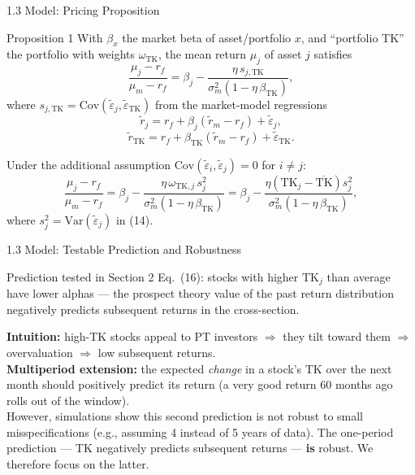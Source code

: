 \documentclass[aspectratio=169, 11pt]{beamer}
\begin{document}
\begin{frame}[shrink=10]{1.3 Model: Pricing Proposition}
\begin{block}{Proposition 1}
With $\beta_x$ the market beta of asset/portfolio $x$, and ``portfolio TK'' the portfolio with weights $\omega_{\mathrm{TK}}$, the mean return $\mu_j$ of asset $j$ satisfies
\begin{equation}
\frac{\mu_j-r_f}{\mu_m-r_f}=\beta_j-\frac{\eta\, s_{j,\mathrm{TK}}}{\sigma_m^2\left(1-\eta\,\beta_{\mathrm{TK}}\right)},
\tag{13}
\end{equation}
where $s_{j,\mathrm{TK}}=\mathrm{Cov}(\tilde{\varepsilon}_j,\tilde{\varepsilon}_{\mathrm{TK}})$ from the market-model regressions
\begin{equation}
\tilde{r}_j=r_f+\beta_j(\tilde{r}_m-r_f)+\tilde{\varepsilon}_j,
\tag{14}
\end{equation}
\begin{equation}
\tilde{r}_{\mathrm{TK}}=r_f+\beta_{\mathrm{TK}}(\tilde{r}_m-r_f)+\tilde{\varepsilon}_{\mathrm{TK}}.
\tag{15}
\end{equation}
\end{block}
\vspace{0.3em}
Under the additional assumption $\mathrm{Cov}(\tilde{\varepsilon}_i,\tilde{\varepsilon}_j)=0$ for $i\neq j$:
\begin{equation}
\frac{\mu_j-r_f}{\mu_m-r_f}=\beta_j-\frac{\eta\,\omega_{\mathrm{TK},j}\,s_j^2}{\sigma_m^2\left(1-\eta\,\beta_{\mathrm{TK}}\right)}
=\beta_j-\frac{\eta\left(\mathrm{TK}_j-\overline{\mathrm{TK}}\right)s_j^2}{\sigma_m^2\left(1-\eta\,\beta_{\mathrm{TK}}\right)},
\tag{16}
\end{equation}
where $s_j^2=\mathrm{Var}(\tilde{\varepsilon}_j)$ in (14).
\end{frame}

\begin{frame}{1.3 Model: Testable Prediction and Robustness}
\begin{block}{Prediction tested in Section 2}
Eq.~(16): stocks with \alert{higher $\mathrm{TK}_j$ than average have lower alphas} --- the prospect theory value of the past return distribution negatively predicts subsequent returns in the cross-section.
\end{block}
\vspace{0.5em}
\textbf{Intuition:} high-TK stocks appeal to PT investors $\Rightarrow$ they tilt toward them $\Rightarrow$ overvaluation $\Rightarrow$ low subsequent returns.\\[0.7em]
\textbf{Multiperiod extension:} the expected \emph{change} in a stock's TK over the next month should positively predict its return (a very good return 60 months ago rolls out of the window).\\[0.5em]
\alert{However}, simulations show this second prediction is \alert{not robust} to small misspecifications (e.g., assuming 4 instead of 5 years of data). The one-period prediction --- TK negatively predicts subsequent returns --- \textbf{is} robust. We therefore focus on the latter.
\end{frame}
\end{document}
